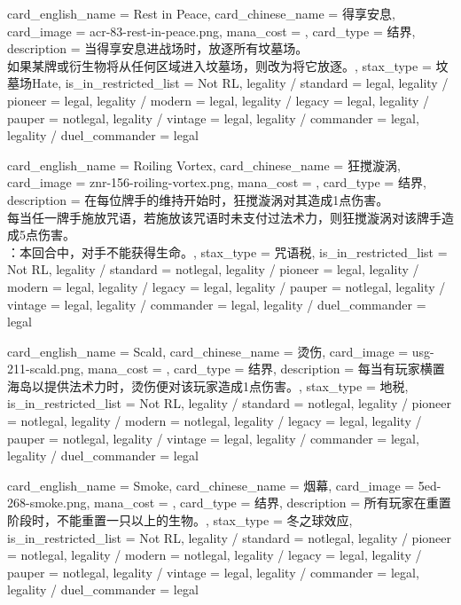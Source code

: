 \documentclass[lang = cn, color = black, 10pt]{AllThatStax}
\begin{document}
\card
{
	card_english_name = {Rest in Peace},
	card_chinese_name = {得享安息},
	card_image = acr-83-rest-in-peace.png,
	mana_cost = ,
	card_type = 结界,
	description = {当得享安息进战场时，放逐所有坟墓场。\\
如果某牌或衍生物将从任何区域进入坟墓场，则改为将它放逐。},
	stax_type = 坟墓场Hate,
	is_in_restricted_list = Not RL,
	legality / standard = legal,
	legality / pioneer = legal,
	legality / modern = legal,
	legality / legacy = legal,
	legality / pauper = notlegal,
	legality / vintage = legal,
	legality / commander = legal,
	legality / duel_commander = legal
}

\card
{
	card_english_name = {Roiling Vortex},
	card_chinese_name = {狂搅漩涡},
	card_image = znr-156-roiling-vortex.png,
	mana_cost = ,
	card_type = 结界,
	description = {在每位牌手的维持开始时，狂搅漩涡对其造成1点伤害。\\
每当任一牌手施放咒语，若施放该咒语时未支付过法术力，则狂搅漩涡对该牌手造成5点伤害。\\
：本回合中，对手不能获得生命。},
	stax_type = 咒语税,
	is_in_restricted_list = Not RL,
	legality / standard = notlegal,
	legality / pioneer = legal,
	legality / modern = legal,
	legality / legacy = legal,
	legality / pauper = notlegal,
	legality / vintage = legal,
	legality / commander = legal,
	legality / duel_commander = legal
}

\card
{
	card_english_name = {Scald},
	card_chinese_name = {烫伤},
	card_image = usg-211-scald.png,
	mana_cost = ,
	card_type = 结界,
	description = {每当有玩家横置海岛以提供法术力时，烫伤便对该玩家造成1点伤害。},
	stax_type = 地税,
	is_in_restricted_list = Not RL,
	legality / standard = notlegal,
	legality / pioneer = notlegal,
	legality / modern = notlegal,
	legality / legacy = legal,
	legality / pauper = notlegal,
	legality / vintage = legal,
	legality / commander = legal,
	legality / duel_commander = legal
}

\card
{
	card_english_name = {Smoke},
	card_chinese_name = {烟幕},
	card_image = 5ed-268-smoke.png,
	mana_cost = ,
	card_type = 结界,
	description = {所有玩家在重置阶段时，不能重置一只以上的生物。},
	stax_type = 冬之球效应,
	is_in_restricted_list = Not RL,
	legality / standard = notlegal,
	legality / pioneer = notlegal,
	legality / modern = notlegal,
	legality / legacy = legal,
	legality / pauper = notlegal,
	legality / vintage = legal,
	legality / commander = legal,
	legality / duel_commander = legal
}
\end{document}
